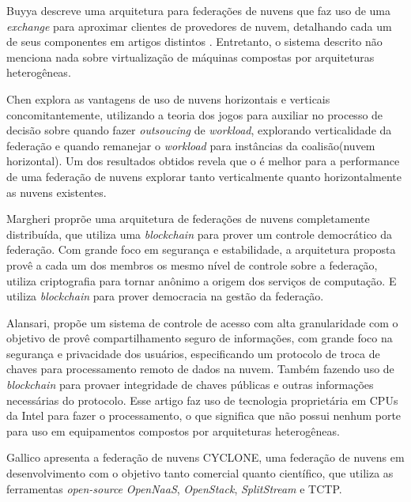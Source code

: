 Buyya \cite{Buyya:2010:IUF:2143583.2143586} descreve uma arquitetura para federações de nuvens que faz uso de uma \textit{exchange} para aproximar clientes de provedores de nuvem, detalhando cada um de seus componentes em artigos distintos \cite{Calheiros:2012:CSE:2263483.2264538}\cite{Garg2013} \cite{4539666} \cite{6063003}. Entretanto, o sistema descrito não menciona nada sobre virtualização de máquinas compostas por arquiteturas heterogêneas.

Chen\cite{7835207} explora as vantagens de uso de nuvens horizontais e verticais concomitantemente, utilizando a teoria dos jogos para auxiliar no processo de decisão sobre quando fazer \textit{outsoucing} de \textit{workload}, explorando verticalidade da federação e quando remanejar o \textit{workload} para instâncias da coalisão(nuvem horizontal). Um dos resultados obtidos revela que o é melhor para a performance de uma federação de nuvens explorar tanto verticalmente quanto horizontalmente as nuvens existentes.

Margheri \cite{FaaS_8030651} proprõe uma arquitetura de federações de nuvens completamente distribuída, que utiliza uma \textit{blockchain} para prover um controle democrático da federação. Com grande foco em segurança e estabilidade, a arquitetura proposta provê a cada um dos membros os mesmo nível de controle sobre a federação, utiliza criptografia para tornar anônimo a origem dos serviços de computação. E utiliza \textit{blockchain} para prover democracia na gestão da federação.

Alansari\cite{ACS_Federation_7980160}, propõe um sistema de controle de acesso com alta granularidade com o objetivo de provê compartilhamento seguro de informações, com grande foco na segurança e privacidade dos usuários, especificando um protocolo de troca de chaves para processamento remoto de dados na nuvem. Também fazendo uso de \textit{blockchain} para provaer integridade de chaves públicas e outras informações necessárias do protocolo. Esse artigo faz uso de tecnologia proprietária em \acrshort{CPU}s da Intel para fazer o processamento, o que significa que não possui nenhum porte para uso em equipamentos compostos por arquiteturas heterogêneas.

Gallico\cite{CYCLONE_7776591} apresenta a federação de nuvens CYCLONE, uma federação de nuvens em desenvolvimento com o objetivo tanto comercial quanto científico, que utiliza as ferramentas \textit{open-source} \textit{OpenNaaS}, \textit{OpenStack}, \textit{SplitStream} e \acrfull{TCTP}.

